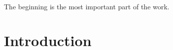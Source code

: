 



\begin{savequote}[50mm]
The beginning is the most important part of the work. 
\end{savequote}

\chapter{Introduction}
\label{cha:Introduction}

\ifpdf
    \graphicspath{{1_introduction/figures/PNG/}{1_introduction/figures/PDF/}{1_introduction/figures/}}
\else
    \graphicspath{{1_introduction/figures/EPS/}{1_introduction/figures/}}
\fi



